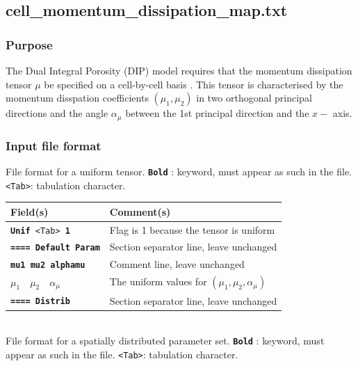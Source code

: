 \subsection{cell\_momentum\_dissipation\_map.txt}\label{sec_Model!Hyperbolic!cellMomentumDissipationMap}
\subsubsection{Purpose}
The Dual Integral Porosity (DIP) model requires that the momentum dissipation tensor $\mu$ be specified on a cell-by-cell basis \cite{Guinot_al_2017}. This tensor is characterised by the momentum disspation coefficients $(\mu_1,\mu_2)$ in two orthogonal principal directions and the angle $\alpha_\mu$ between the 1st principal direction and the $x-$ axis.
%
\subsubsection{Input file format}
%
File format for a uniform tensor.  \texttt{\textbf{Bold}} : keyword, must appear as such in the file. \texttt{<Tab>}: tabulation character. \\
    \begin{tabular}{p{6cm} | p{9cm}}
    \hline
    Field(s) & Comment(s) \\
    \hline  \hline
    \texttt{\textbf{Unif} <Tab> \textbf{1}} & Flag is 1 because the tensor is uniform \\ \hline
    \texttt{\textbf{==== Default Param}} & Section separator line, leave unchanged \\  \hline
    \texttt{\textbf{mu1}  \textbf{mu2}  \textbf{alphamu}} & Comment line, leave unchanged \\  \hline
    $\mu_1 \quad \mu_2 \quad \alpha_\mu$      & The uniform values for $(\mu_1, \mu_2, \alpha_\mu)$ \\ \hline
    \texttt{\textbf{==== Distrib}} & Section separator line, leave unchanged \\  \hline
    \end{tabular}
%
\vspace{10mm} \\
%
File format for a spatially distributed parameter set.  \texttt{\textbf{Bold}} : keyword, must appear as such in the file. \texttt{<Tab>}: tabulation character. \\

